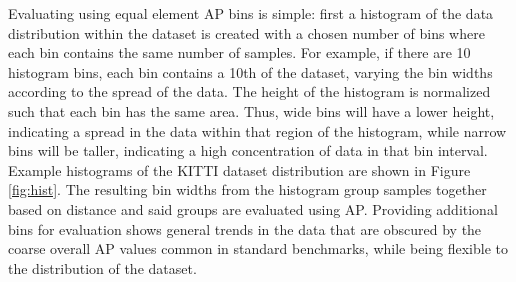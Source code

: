 \documentclass[10pt, conference, compsocconf]{IEEEtran}
\begin{document}
Evaluating using equal element AP bins is simple: first a histogram of the data distribution within the dataset is created with a chosen number of bins where each bin contains the same number of samples. For example, if there are 10 histogram bins, each bin contains a 10th of the dataset, varying the bin widths according to the spread of the data. The height of the histogram is normalized such that each bin has the same area. Thus, wide bins will have a lower height, indicating a spread in the data within that region of the histogram, while narrow bins will be taller, indicating a high concentration of data in that bin interval. Example histograms of the KITTI dataset distribution are shown in Figure \ref{fig:hist}. The resulting bin widths from the histogram group samples together based on distance and said groups are evaluated using AP. Providing additional bins for evaluation shows general trends in the data that are obscured by the coarse overall AP values common in standard benchmarks, while being flexible to the distribution of the dataset.
\end{document}
